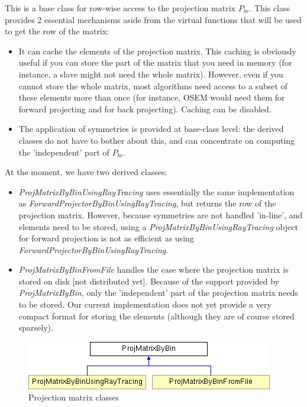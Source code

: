 \documentclass{article}
\begin{document}
This is a base class for row-wise access to the projection matrix $P_{bv}$. 
This class provides 2 essential mechanisms aside from the virtual 
functions that will be used to get the row of the matrix:
\begin{itemize}
\item 
It can cache the elements of the projection matrix. This caching 
is obviously useful if you can store the part of the matrix that 
you need in memory (for instance, a slave might not need the 
whole matrix). However, even if you cannot store the whole matrix, 
most algorithms need access to a subset of these elements more 
than once (for instance, OSEM would need them for forward projecting 
and for back projecting). Caching can be disabled.
\item 
The application of symmetries is provided at base-class level: 
the derived classes do not have to bother about this, and can 
concentrate on computing the 'independent' part of $P_{bv}$. 
\end{itemize}


At the moment, we have two derived classes:
\begin{itemize}
\item 
\textit{ProjMatrixByBinUsingRayTracing} uses essentially the same 
implementation as \textit{ForwardProjectorByBinUsingRayTracing}, but 
returns the row of the projection matrix. However, because symmetries 
are not handled 'in-line', and elements need to be stored, using 
a \textit{ProjMatrixByBinUsingRayTracing} object for forward projection 
is not as efficient as using \textit{ForwardProjectorByBinUsingRayTracing}.
\item 
\textit{ProjMatrixByBinFromFile} handles the case where the projection 
matrix is stored on disk [not distributed yet]. Because of the 
support provided by \textit{ProjMatrixByBin}, only the 'independent' 
part of the projection matrix needs to be stored. Our current 
implementation does not yet provide a very compact format for 
storing the elements (although they are of course stored sparsely).
\end{itemize}

\begin{figure}[htbp]
\begin{center}
\includegraphics[bb = 0 0 407 79, scale=0.52]{graphics/STIR-developers-overviewFig12}
\caption{Projection matrix classes}
\end{center}
\end{figure}
\end{document}
